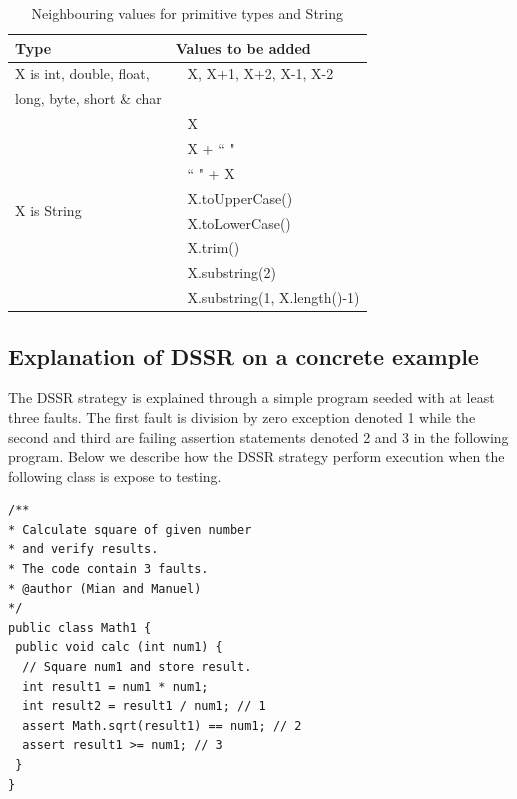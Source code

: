 \documentclass[conference]{IEEEtran}
\begin{document}
\begin{table}[ht]
\caption{Neighbouring values for primitive types and String} %
\centering %
\begin{tabular}{| l | l |} %
\hline\hline %
Type & Values to be added\\ [0.5ex] %
\hline %
\multirow{1}{*}{X is int, double, float, } & ~ X,  X+1, X+2, X-1, X-2 \\ %
\multirow{1}{*}{long, byte, short \& char} &  \\ 

\hline
\multirow{8}{*}{X is String} & ~ X\\ %

& ~ X + ``  "\\ %
& ~ ``  " + X \\ %
& ~ X.toUpperCase() \\
& ~ X.toLowerCase() \\
& ~ X.trim() \\
& ~ X.substring(2) \\
& ~ X.substring(1, X.length()-1) \\[1ex]
\hline
\hline %
\end{tabular}
\label{table:addvalues} %
\end{table}







\subsection{Explanation of DSSR on a concrete example}
The DSSR strategy is explained through a simple program seeded with at least three faults. The first fault is division by zero exception denoted 1 while the second and third are failing assertion statements denoted 2 and 3 in the following program.  Below we describe how the DSSR strategy perform execution when the following class is expose to testing.

\begin{lstlisting}
/** 
* Calculate square of given number 
* and verify results. 
* The code contain 3 faults.
* @author (Mian and Manuel)
*/
public class Math1 {
 public void calc (int num1) {
  // Square num1 and store result. 
  int result1 = num1 * num1;
  int result2 = result1 / num1; // 1
  assert Math.sqrt(result1) == num1; // 2
  assert result1 >= num1; // 3
 } 
}
\end{lstlisting}
\end{document}
